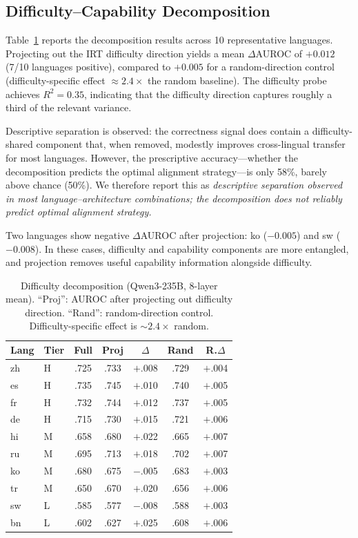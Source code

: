 \documentclass[11pt,a4paper]{article}
\newcommand{\auroc}{AUROC}
\begin{document}
\subsection{Difficulty--Capability Decomposition}
\label{sec:decomposition}

Table~\ref{tab:decomposition} reports the decomposition results across 10 representative languages. Projecting out the IRT difficulty direction yields a mean $\Delta$\auroc{} of $+0.012$ (7/10 languages positive), compared to $+0.005$ for a random-direction control (difficulty-specific effect $\approx 2.4\times$ the random baseline). The difficulty probe achieves $R^2=0.35$, indicating that the difficulty direction captures roughly a third of the relevant variance.

Descriptive separation is observed: the correctness signal does contain a difficulty-shared component that, when removed, modestly improves cross-lingual transfer for most languages. However, the prescriptive accuracy---whether the decomposition predicts the optimal alignment strategy---is only 58\%, barely above chance (50\%). We therefore report this as \emph{descriptive separation observed in most language--architecture combinations; the decomposition does not reliably predict optimal alignment strategy.}

Two languages show negative $\Delta$\auroc{} after projection: ko ($-0.005$) and sw ($-0.008$). In these cases, difficulty and capability components are more entangled, and projection removes useful capability information alongside difficulty.

\begin{table}[t]
\centering
\small
\begin{tabular}{llccccc}
\toprule
Lang & Tier & Full & Proj & $\Delta$ & Rand & R.$\Delta$ \\
\midrule
zh & H & .725 & .733 & $+$.008 & .729 & $+$.004 \\
es & H & .735 & .745 & $+$.010 & .740 & $+$.005 \\
fr & H & .732 & .744 & $+$.012 & .737 & $+$.005 \\
de & H & .715 & .730 & $+$.015 & .721 & $+$.006 \\
hi & M & .658 & .680 & $+$.022 & .665 & $+$.007 \\
ru & M & .695 & .713 & $+$.018 & .702 & $+$.007 \\
ko & M & .680 & .675 & $-$.005 & .683 & $+$.003 \\
tr & M & .650 & .670 & $+$.020 & .656 & $+$.006 \\
sw & L & .585 & .577 & $-$.008 & .588 & $+$.003 \\
bn & L & .602 & .627 & $+$.025 & .608 & $+$.006 \\
\bottomrule
\end{tabular}
\caption{Difficulty decomposition (Qwen3-235B, 8-layer mean). ``Proj'': \auroc{} after projecting out difficulty direction. ``Rand'': random-direction control. Difficulty-specific effect is ${\sim}2.4\times$ random.}
\label{tab:decomposition}
\end{table}
\end{document}
